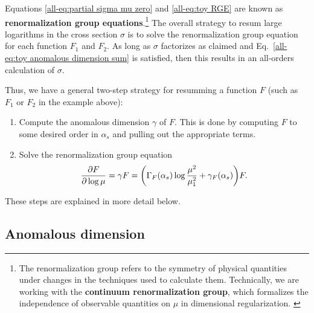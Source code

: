 \documentclass[../thesis.tex]{subfiles}
\begin{document}
	Equations \ref{all-eq:partial sigma mu zero} and \ref{all-eq:toy RGE} are known as \textbf{renormalization group equations}.\footnote{The renormalization group refers to the symmetry of physical quantities under changes in the techniques used to calculate them. Technically, we are working with the \textbf{continuum renormalization group}, which formalizes the independence of observable quantities on $\mu$ in dimensional regularization. \cite{schwartz_quantum_2014}} The overall strategy to resum large logarithms in the cross section $\sigma$ is to solve the renormalization group equation for each function $F_1$ and $F_2$. As long as $\sigma$ factorizes as claimed and Eq.~\ref{all-eq:toy anomalous dimension sum} is satisfied, then this results in an all-orders calculation of $\sigma$.

	Thus, we have a general two-step strategy for resumming a function $F$ (such as $F_1$ or $F_2$ in the example above):
	\begin{enumerate}
		\item Compute the anomalous dimension $\gamma$ of $F$. This is done by computing $F$ to some desired order in $\alpha_s$ and pulling out the appropriate terms. 

		\item Solve the renormalization group equation
		\begin{equation}\label{all-eq:general RGE}
			\frac{\partial F}{\partial \log \mu} = \gamma F = \qty(\Gamma_F(\alpha_s) \log\frac{\mu^2}{\mu_1^2} + \gamma_F(\alpha_s))F.
		\end{equation}
	\end{enumerate}
	These steps are explained in more detail below.

\subsection{Anomalous dimension}
\end{document}
